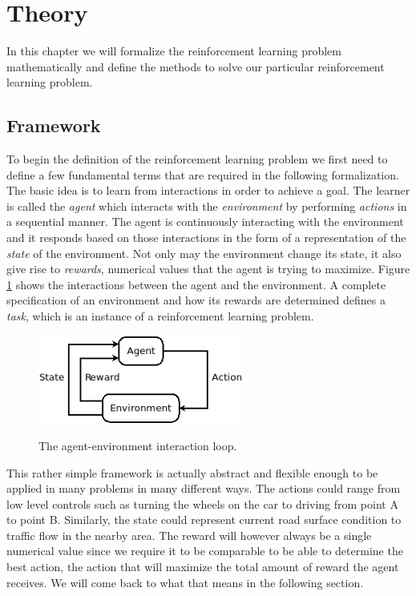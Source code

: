\documentclass[result.tex]{subfiles}
\begin{document}
    \section*{\centering Theory}

    In this chapter we will formalize the reinforcement learning problem mathematically and define the methods to solve our particular reinforcement learning problem.

    \subsection*{Framework}

    To begin the definition of the reinforcement learning problem we first need to define a few fundamental terms that are required in the following formalization. The basic idea is to learn from interactions in order to achieve a goal. The learner is called the \textit{agent} which interacts with the \textit{environment} by performing \textit{actions} in a sequential manner. The agent is continuously interacting with the environment and it responds based on those interactions in the form of a representation of the \textit{state} of the environment. Not only may the environment change its state, it also give rise to \textit{rewards}, numerical values that the agent is trying to maximize. Figure \ref{fig:agent_env} shows the interactions between the agent and the environment. A complete specification of an environment and how its rewards are determined defines a \textit{task}, which is an instance of a reinforcement learning problem.

    \begin{figure}[H]
        \centering
        \includegraphics[width=0.6\textwidth]{./images/agent_env}
        \label{fig:agent_env}
        \caption{The agent-environment interaction loop.}
    \end{figure}

    This rather simple framework is actually abstract and flexible enough to be applied in many problems in many different ways. The actions could range from low level controls such as turning the wheels on the car to driving from point A to point B. Similarly, the state could represent current road surface condition to traffic flow in the nearby area. The reward will however always be a single numerical value since we require it to be comparable to be able to determine the best action, the action that will maximize the total amount of reward the agent receives. We will come back to what that means in the following section.
\end{document}
